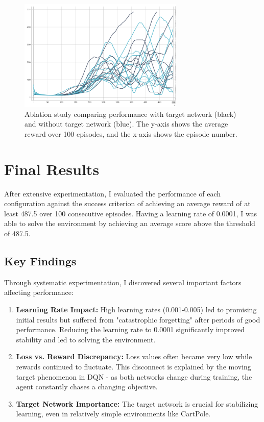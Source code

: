 \documentclass{article}
\begin{document}
\begin{figure}[h]
  \centering
  \includegraphics[width=0.7\textwidth]{media/target_ablation.png}
  \caption{Ablation study comparing performance with target network (black) and without target network (blue). The y-axis shows the average reward over 100 episodes, and the x-axis shows the episode number.}
  \label{fig:target_ablation}
  \end{figure}

\section{Final Results}
After extensive experimentation, I evaluated the performance of each configuration against the success criterion of achieving an average reward of at least 487.5 over 100 consecutive episodes. Having a learning rate of 0.0001, I was able to solve the environment by achieving an average score above the threshold of 487.5.

\subsection{Key Findings}
Through systematic experimentation, I discovered several important factors affecting performance:

\begin{enumerate}
    \item \textbf{Learning Rate Impact:} High learning rates (0.001-0.005) led to promising initial results but suffered from "catastrophic forgetting" after periods of good performance. Reducing the learning rate to 0.0001 significantly improved stability and led to solving the environment.
    
    \item \textbf{Loss vs. Reward Discrepancy:} Loss values often became very low while rewards continued to fluctuate. This disconnect is explained by the moving target phenomenon in DQN - as both networks change during training, the agent constantly chases a changing objective.
    
    \item \textbf{Target Network Importance:} The target network is crucial for stabilizing learning, even in relatively simple environments like CartPole.
\end{enumerate}
\end{document}
